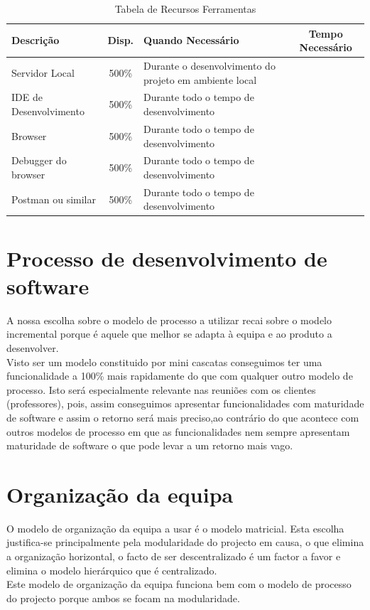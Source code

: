 \documentclass[a4paper]{report}
\begin{document}
\begin{table}[h]
\centering
\begin{tabularx}{\textwidth}{l|c|X|c}
\textbf{Descrição} & \textbf{Disp.} & \textbf{Quando Necessário} & \textbf{Tempo Necessário} \\ \hline
Servidor Local & 500\% & Durante o desenvolvimento do projeto em ambiente local &  \\ \hline
IDE de Desenvolvimento & 500\% & Durante todo o tempo de desenvolvimento &  \\ \hline
Browser & 500\% & Durante todo o tempo de desenvolvimento &  \\ \hline
Debugger do browser & 500\% & Durante todo o tempo de desenvolvimento &  \\ \hline
Postman ou similar & 500\% & Durante todo o tempo de desenvolvimento &  \\
\end{tabularx}
\caption{Tabela de Recursos Ferramentas}
\label{TabF}
\end{table}

\pagebreak
\section{Processo de desenvolvimento de software}
A nossa escolha sobre o modelo de processo a utilizar recai sobre o modelo incremental porque é aquele que melhor se adapta à equipa e ao produto a desenvolver.\\
Visto ser um modelo constituido por mini cascatas conseguimos ter uma funcionalidade a 100\% mais rapidamente do que com qualquer outro modelo de processo. Isto será especialmente relevante nas reuniões com os clientes (professores), pois, assim conseguimos apresentar funcionalidades com maturidade de software e assim o retorno será mais preciso,ao contrário do que acontece com outros modelos de processo em que as funcionalidades nem sempre apresentam maturidade de software o que pode levar a um retorno mais vago.
\pagebreak

\section{Organização da equipa}
O modelo de organização da equipa a usar é o modelo matricial. Esta escolha justifica-se principalmente pela modularidade do projecto em causa, o que elimina a organização horizontal, o facto de ser descentralizado é um factor a favor e elimina o modelo hierárquico que é centralizado.\\
Este modelo de organização da equipa funciona bem com o modelo de processo do projecto porque ambos se focam na modularidade.\\
\end{document}
